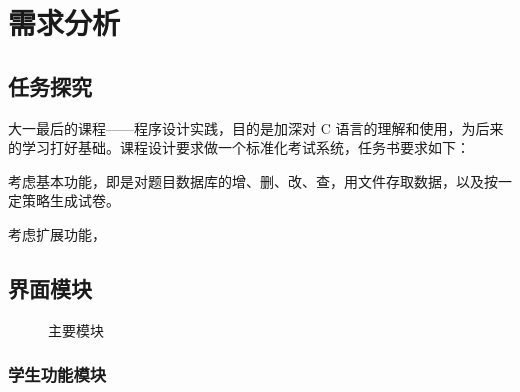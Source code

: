 \section{需求分析}

\subsection{任务探究}

大一最后的课程——程序设计实践，目的是加深对 C 语言的理解和使用，为后来的学习打好基础。课程设计要求做一个标准化考试系统，任务书要求如下：

\begin{quote}\small
\tasktext
\end{quote}

考虑基本功能，即是对题目数据库的增、删、改、查，用文件存取数据，以及按一定策略生成试卷。

考虑扩展功能，

\subsection{界面模块}

\begin{figure}[htp]
  \centering
  \linespread{1}
  \caption{\label{al_main}主要模块}  
\end{figure}

\subsubsection{学生功能模块}

